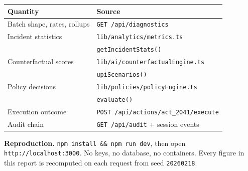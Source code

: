 \documentclass[10pt,twocolumn,a4paper]{article}
\newcommand{\code}[1]{\texttt{\small #1}}
\begin{document}
\begin{center}
\small
\begin{tabular}{@{}l l@{}}
\toprule
\textbf{Quantity} & \textbf{Source} \\
\midrule
Batch shape, rates, rollups & \code{GET /api/diagnostics} \\
Incident statistics         & \code{lib/analytics/metrics.ts} \\
                            & \quad \code{getIncidentStats()} \\
Counterfactual scores       & \code{lib/ai/counterfactualEngine.ts} \\
                            & \quad \code{upiScenarios()} \\
Policy decisions            & \code{lib/policies/policyEngine.ts} \\
                            & \quad \code{evaluate()} \\
Execution outcome           & \code{POST /api/actions/act\_2041/execute} \\
Audit chain                 & \code{GET /api/audit} + session events \\
\bottomrule
\end{tabular}
\end{center}

\vspace{4mm}
\noindent
\textbf{Reproduction.} \code{npm install \&\& npm run dev}, then open
\code{http://localhost:3000}. No keys, no database, no containers. Every figure in
this report is recomputed on each request from seed \code{20260218}.
\end{document}
